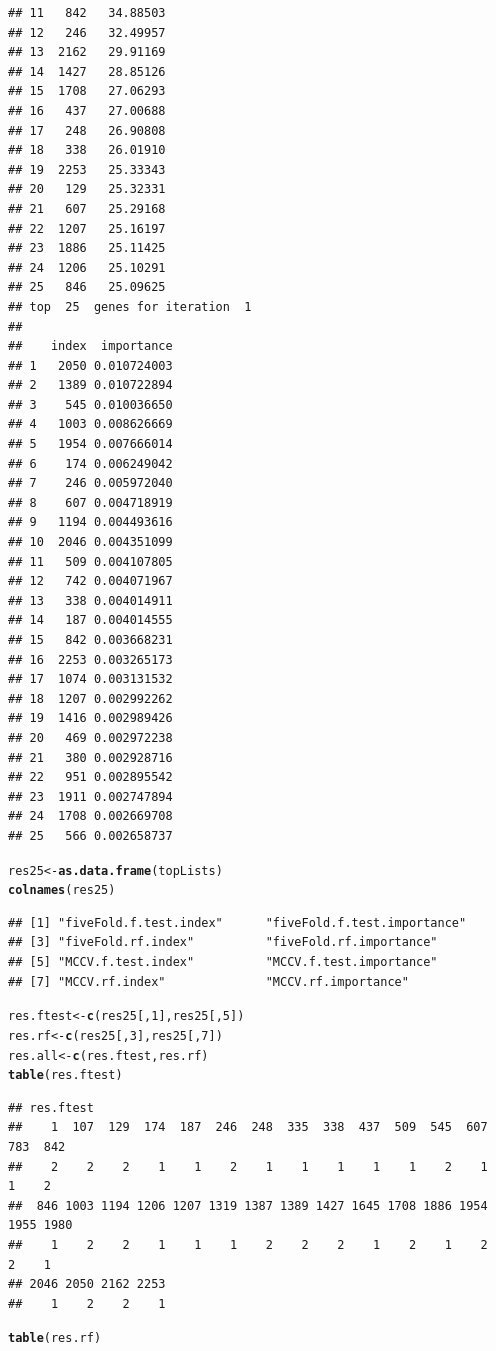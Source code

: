 \documentclass{article}\usepackage[]{graphicx}\usepackage[]{color}
\makeatletter
\newcommand{\hlnum}[1]{\textcolor[rgb]{0.686,0.059,0.569}{#1}}%
\newcommand{\hlstd}[1]{\textcolor[rgb]{0.345,0.345,0.345}{#1}}%
\newcommand{\hlkwb}[1]{\textcolor[rgb]{0.69,0.353,0.396}{#1}}%
\newcommand{\hlkwd}[1]{\textcolor[rgb]{0.737,0.353,0.396}{\textbf{#1}}}%
\newenvironment{kframe}{%
 \def\at@end@of@kframe{}%
 \ifinner\ifhmode%
  \def\at@end@of@kframe{\end{minipage}}%
  \begin{minipage}{\columnwidth}%
 \fi\fi%
 \def\FrameCommand##1{\hskip\@totalleftmargin \hskip-\fboxsep
 \colorbox{shadecolor}{##1}\hskip-\fboxsep
     \hskip-\linewidth \hskip-\@totalleftmargin \hskip\columnwidth}%
 \MakeFramed {\advance\hsize-\width
   \@totalleftmargin\z@ \linewidth\hsize
   \@setminipage}}%
 {\par\unskip\endMakeFramed%
 \at@end@of@kframe}
\newenvironment{knitrout}{}{} %
\makeatother
\begin{document}
\begin{knitrout}
\begin{kframe}
\begin{verbatim}
## 11   842   34.88503
## 12   246   32.49957
## 13  2162   29.91169
## 14  1427   28.85126
## 15  1708   27.06293
## 16   437   27.00688
## 17   248   26.90808
## 18   338   26.01910
## 19  2253   25.33343
## 20   129   25.32331
## 21   607   25.29168
## 22  1207   25.16197
## 23  1886   25.11425
## 24  1206   25.10291
## 25   846   25.09625
## top  25  genes for iteration  1 
##  
##    index  importance
## 1   2050 0.010724003
## 2   1389 0.010722894
## 3    545 0.010036650
## 4   1003 0.008626669
## 5   1954 0.007666014
## 6    174 0.006249042
## 7    246 0.005972040
## 8    607 0.004718919
## 9   1194 0.004493616
## 10  2046 0.004351099
## 11   509 0.004107805
## 12   742 0.004071967
## 13   338 0.004014911
## 14   187 0.004014555
## 15   842 0.003668231
## 16  2253 0.003265173
## 17  1074 0.003131532
## 18  1207 0.002992262
## 19  1416 0.002989426
## 20   469 0.002972238
## 21   380 0.002928716
## 22   951 0.002895542
## 23  1911 0.002747894
## 24  1708 0.002669708
## 25   566 0.002658737
\end{verbatim}
\begin{alltt}
\hlstd{res25}\hlkwb{<-} \hlkwd{as.data.frame}\hlstd{(topLists)}
\hlkwd{colnames}\hlstd{(res25)}
\end{alltt}
\begin{verbatim}
## [1] "fiveFold.f.test.index"      "fiveFold.f.test.importance"
## [3] "fiveFold.rf.index"          "fiveFold.rf.importance"    
## [5] "MCCV.f.test.index"          "MCCV.f.test.importance"    
## [7] "MCCV.rf.index"              "MCCV.rf.importance"
\end{verbatim}
\begin{alltt}
\hlstd{res.ftest} \hlkwb{<-} \hlkwd{c}\hlstd{(res25[,}\hlnum{1}\hlstd{], res25[,}\hlnum{5}\hlstd{])}
\hlstd{res.rf} \hlkwb{<-}  \hlkwd{c}\hlstd{(res25[,}\hlnum{3}\hlstd{], res25[,}\hlnum{7}\hlstd{])}
\hlstd{res.all} \hlkwb{<-} \hlkwd{c}\hlstd{(res.ftest, res.rf)}
\hlkwd{table}\hlstd{(res.ftest)}
\end{alltt}
\begin{verbatim}
## res.ftest
##    1  107  129  174  187  246  248  335  338  437  509  545  607  783  842 
##    2    2    2    1    1    2    1    1    1    1    1    2    1    1    2 
##  846 1003 1194 1206 1207 1319 1387 1389 1427 1645 1708 1886 1954 1955 1980 
##    1    2    2    1    1    1    2    2    2    1    2    1    2    2    1 
## 2046 2050 2162 2253 
##    1    2    2    1
\end{verbatim}
\begin{alltt}
\hlkwd{table}\hlstd{(res.rf)}

\end{alltt}
\end{kframe}
\end{knitrout}
\end{document}

